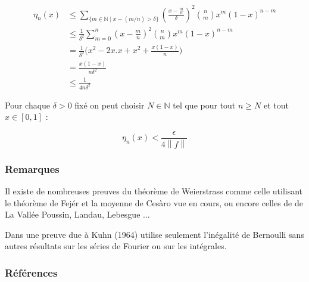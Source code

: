 \documentclass[
	10pt, %
	xcolor={svgnames}
]{beamer}
\begin{document}
\begin{frame}

\begin{align*}
	\eta_n(x) &\leq \sum_{\{m \in \mathbb{N} \mid x - (m/n) > \delta \}} \left( \frac{x-\frac{m}{n}}{\delta} \right )^{2} \binom{n}{m} x^{m}(1-x)^{n-m} \\
		  &\leq \frac{1}{\delta^{2}} \sum_{m=0}^{n} \left( x-\frac{m}{n} \right)^{2} \binom{n}{m} x^{m}(1-x)^{n-m} \\
		  &= \frac{1}{\delta^{2}} \bigl( x^{2}-2x.x+x^{2}+\frac{x(1-x)}{n} \bigr) \\
		  &= \frac{x(1-x)}{n\delta^{2}} \\
		  &\leq \frac{1}{4n\delta^{2}}
\end{align*}

Pour chaque \( \delta > 0 \) fixé on peut choisir \( N \in \mathbb{N} \) tel que pour tout \( n \geq N \) et tout \( x \in [0,1] \) :

\begin{equation*}
	\eta_n(x) < \frac{\epsilon}{4 {\left\lVert f \right\rVert}} 
\end{equation*}

\end{frame}


\begin{frame}
	\frametitle{Remarques}

	Il existe de nombreuses preuves du théorème de Weierstrass comme celle utilisant le théorème de Fejér et la moyenne de Cesàro vue en cours, ou encore celles de de La Vallée Poussin, Landau, Lebesgue ...

	Dans \cite[p.~ 60-61]{pinkus2000approximation} une preuve due à Kuhn (1964) utilise seulement l'inégalité de Bernoulli sans autres résultats sur les séries de Fourier ou sur les intégrales.
\end{frame}

\begin{frame} %
	\frametitle{Références}	
	\printbibliography

\end{frame}
\end{document}
